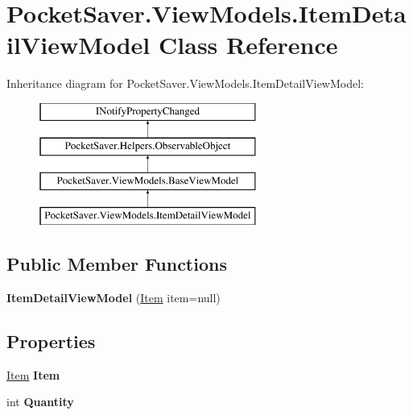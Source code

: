 \hypertarget{class_pocket_saver_1_1_view_models_1_1_item_detail_view_model}{}\section{Pocket\+Saver.\+View\+Models.\+Item\+Detail\+View\+Model Class Reference}
\label{class_pocket_saver_1_1_view_models_1_1_item_detail_view_model}
Inheritance diagram for Pocket\+Saver.\+View\+Models.\+Item\+Detail\+View\+Model\+:\begin{figure}[H]
\begin{center}
\leavevmode
\includegraphics[height=4.000000cm]{class_pocket_saver_1_1_view_models_1_1_item_detail_view_model}
\end{center}
\end{figure}
\subsection*{Public Member Functions}
\begin{DoxyCompactItemize}
\item 
\mbox{\label{class_pocket_saver_1_1_view_models_1_1_item_detail_view_model_af1d90985e2d67dfab6222c901004d0e1}} 
{\bfseries Item\+Detail\+View\+Model} (\hyperlink{class_pocket_saver_1_1_models_1_1_item}{Item} item=null)
\end{DoxyCompactItemize}
\subsection*{Properties}
\begin{DoxyCompactItemize}
\item 
\mbox{\label{class_pocket_saver_1_1_view_models_1_1_item_detail_view_model_a47380690257d441f6e430422f620b7ba}} 
\hyperlink{class_pocket_saver_1_1_models_1_1_item}{Item} {\bfseries Item}
\item 
\mbox{\label{class_pocket_saver_1_1_view_models_1_1_item_detail_view_model_a34c5b071c8ae1be0160b67007b308a51}} 
int {\bfseries Quantity}
\end{DoxyCompactItemize}

